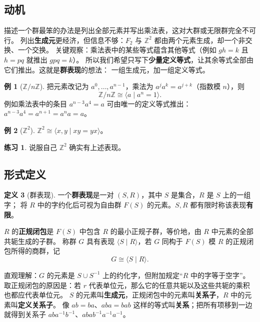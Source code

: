 \documentclass[11pt,a4paper]{article}
\theoremstyle{definition}
\newtheorem{definition}{定义}[section]
\newtheorem{example}[definition]{例}
\newtheorem{exercise}{练习}
\theoremstyle{plain}
\theoremstyle{remark}
\newcommand{\Z}{\mathbb{Z}}
\begin{document}
\subsection{动机}

描述一个群最笨的办法是列出全部元素并写出乘法表，这对大群或无限群完全不可行。
列出\textbf{生成元}更经济，但信息不够：$F_2$ 与 $\Z^2$ 都由两个元素生成，却一个非交换、一个交换。
关键观察：乘法表中的某些等式蕴含其他等式（例如 $gh=k$ 且 $h=pq$ 就推出 $gpq=k$）。
所以我们希望只写下\textbf{少量定义等式}，让其余等式全部由它们推出。这就是\textbf{群表现}的想法：
一组生成元，加一组定义等式。

\begin{example}[$\Z/n\Z$]
把元素改记为 $a^0,\dots,a^{n-1}$，乘法为 $a^ja^k=a^{j+k}$（指数模 $n$），则
\[
  \Z/n\Z\cong\langle a\mid a^n=1\rangle .
\]
例如乘法表中的条目 $a^{n-3}a^4=a$ 可由唯一的定义等式推出：$a^{n-3}a^4=a^{n+1}=a^na=a$。
\end{example}

\begin{example}[$\Z^2$]
$\Z^2\cong\langle x,y\mid xy=yx\rangle$。
\end{example}
\begin{exercise}
说服自己 $\Z^2$ 确实有上述表现。
\end{exercise}

\subsection{形式定义}

\begin{definition}[群表现]
一个\textbf{群表现}是一对 $(S,R)$，其中 $S$ 是集合，$R$ 是 $S$ 上的一组字；
将 $R$ 中的字约化后可视为自由群 $F(S)$ 的元素。$S,R$ 都有限时称该表现\textbf{有限}。

$R$ 的\textbf{正规闭包}是 $F(S)$ 中包含 $R$ 的最小正规子群，等价地，由 $R$ 中元素的全部共轭生成的子群。
称群 $G$ 具有表现 $\langle S\mid R\rangle$，若 $G$ 同构于 $F(S)$ 模 $R$ 的正规闭包所得的商群，记
\[
  G\cong\langle S\mid R\rangle .
\]
\end{definition}

直观理解：$G$ 的元素是 $S\cup S^{-1}$ 上的约化字，但附加规定“$R$ 中的字等于空字”。
取正规闭包的原因是：若 $r$ 代表单位元，那么它的任意共轭以及这些共轭的乘积也都应代表单位元。
$S$ 的元素叫\textbf{生成元}，正规闭包中的元素叫\textbf{关系子}，$R$ 中的元素叫\textbf{定义关系子}。
像 $ab=ba$、$aba=bab$ 这样的等式叫\textbf{关系}；把所有项移到一边就得到关系子 $aba^{-1}b^{-1}$、$abab^{-1}a^{-1}a^{-1}$。
\end{document}
